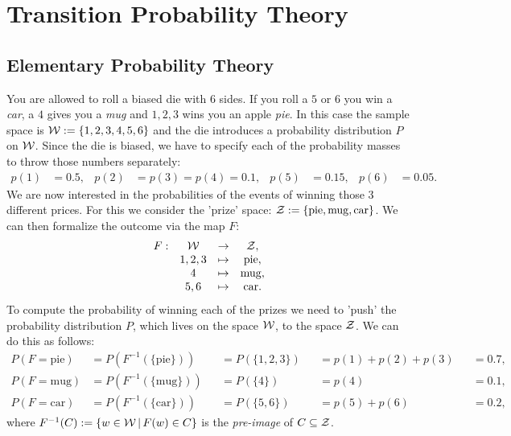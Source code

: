 \section{Transition Probability Theory}
 

\subsection{Elementary Probability Theory}

\begin{Eg}%
    \label{example-die}
    You are allowed to roll a biased die with 6 sides. If you roll a $5$ or $6$ you win a \emph{car}, a $4$ 
    gives you a \emph{mug} 
    and $1,2,3$ wins you an apple \emph{pie}. 
    In this case the sample space is $\mathcal{W} :=\{1,2,3,4,5,6\}$ and the die introduces a probability distribution $P$ on $\mathcal{W}$.
    Since the die is biased, we have to specify 
    each of the probability masses to throw those numbers separately: 
    \begin{align*}
        p(1) & = 0.5, &
        p(2) & = p(3) = p(4) = 0.1, &
        p(5) & = 0.15 , & 
        p(6) & = 0.05.
    \end{align*}
    We are now interested in the probabilities of the events of winning those 3 different prices. 
    For this we consider the 'prize' space: $\mathcal{Z} :=\{\mathrm{pie}, \mathrm{mug}, \mathrm{car}\}$. 
    We can then formalize the outcome via the map $F$:
    \[\begin{array}{cccc}
        F: & \mathcal{W} &\to& \mathcal{Z},\\
           &1,2,3 &\mapsto& \mathrm{pie},\\
        & 4 & \mapsto& \mathrm{mug},\\
        & 5,6 & \mapsto& \mathrm{car}.
    \end{array}\]
    To compute the probability of winning each of the prizes we need to 'push' the probability distribution $P$, which lives on the space $\mathcal{W}$, to the space $\mathcal{Z}$. We can do this as follows:
    \begin{align*}
        P(F=\mathrm{pie}) &= P(F^{-1}(\{\mathrm{pie}\})) && = P(\{1,2,3\}) && = p(1)+p(2)+p(3) && = 0.7,\\
            P(F=\mathrm{mug}) &= P(F^{-1}(\{\mathrm{mug}\})) && = P(\{4\}) && = p(4) && = 0.1,\\
            P(F=\mathrm{car}) &= P(F^{-1}(\{\mathrm{car}\})) && = P(\{5,6\}) && = p(5)+p(6) && = 0.2,
    \end{align*}
    where $F^{-1}(C) := \{w \in \mathcal{W}\,|\,F(w) \in C\}$ is the \emph{pre-image} of $C \subseteq \mathcal{Z}$.
\end{Eg}

